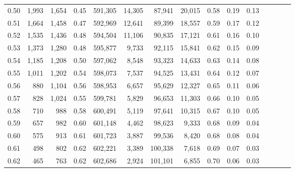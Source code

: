 \begin{tabular}{rrrcrrrrrrrrrrr}
0.50 &   1,993 &  1,654 &                                       0.45 &  591,305 &   14,305 &   87,941 &   20,015 &  0.58 &  0.19 &                         0.13 \\
0.51 &   1,664 &  1,458 &                                       0.47 &  592,969 &   12,641 &   89,399 &   18,557 &  0.59 &  0.17 &                         0.12 \\
0.52 &   1,535 &  1,436 &                                       0.48 &  594,504 &   11,106 &   90,835 &   17,121 &  0.61 &  0.16 &                         0.10 \\
0.53 &   1,373 &  1,280 &                                       0.48 &  595,877 &    9,733 &   92,115 &   15,841 &  0.62 &  0.15 &                         0.09 \\
0.54 &   1,185 &  1,208 &                                       0.50 &  597,062 &    8,548 &   93,323 &   14,633 &  0.63 &  0.14 &                         0.08 \\
0.55 &   1,011 &  1,202 &                                       0.54 &  598,073 &    7,537 &   94,525 &   13,431 &  0.64 &  0.12 &                         0.07 \\
0.56 &     880 &  1,104 &                                       0.56 &  598,953 &    6,657 &   95,629 &   12,327 &  0.65 &  0.11 &                         0.06 \\
0.57 &     828 &  1,024 &                                       0.55 &  599,781 &    5,829 &   96,653 &   11,303 &  0.66 &  0.10 &                         0.05 \\
0.58 &     710 &    988 &                                       0.58 &  600,491 &    5,119 &   97,641 &   10,315 &  0.67 &  0.10 &                         0.05 \\
0.59 &     657 &    982 &                                       0.60 &  601,148 &    4,462 &   98,623 &    9,333 &  0.68 &  0.09 &                         0.04 \\
0.60 &     575 &    913 &                                       0.61 &  601,723 &    3,887 &   99,536 &    8,420 &  0.68 &  0.08 &                         0.04 \\
0.61 &     498 &    802 &                                       0.62 &  602,221 &    3,389 &  100,338 &    7,618 &  0.69 &  0.07 &                         0.03 \\
0.62 &     465 &    763 &                                       0.62 &  602,686 &    2,924 &  101,101 &    6,855 &  0.70 &  0.06 &                         0.03 \\

\end{tabular}
